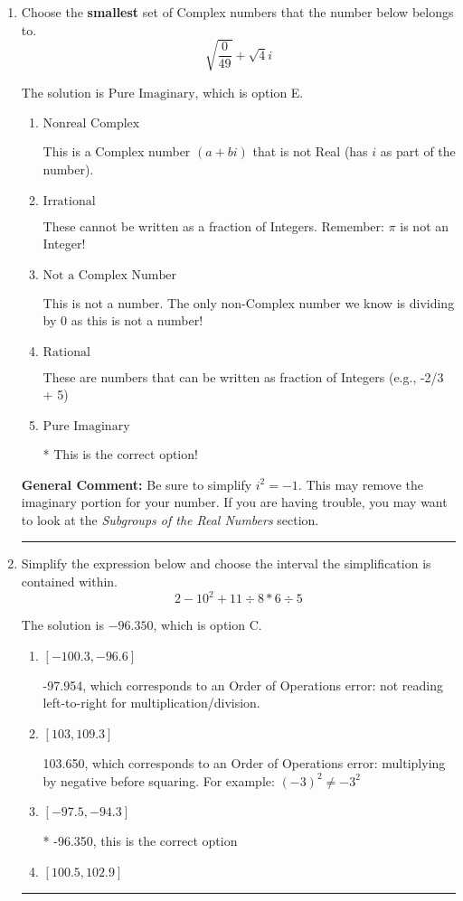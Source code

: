 \documentclass{extbook}[14pt]
\newcommand{\litem}[1]{\item #1

\rule{\textwidth}{0.4pt}}
\begin{document}
\begin{enumerate}\litem{
Choose the \textbf{smallest} set of Complex numbers that the number below belongs to.
\[ \sqrt{\frac{0}{49}}+\sqrt{4}i \]

The solution is \( \text{Pure Imaginary} \), which is option E.\begin{enumerate}[label=\Alph*.]
\item \( \text{Nonreal Complex} \)

This is a Complex number $(a+bi)$ that is not Real (has $i$ as part of the number).
\item \( \text{Irrational} \)

These cannot be written as a fraction of Integers. Remember: $\pi$ is not an Integer!
\item \( \text{Not a Complex Number} \)

This is not a number. The only non-Complex number we know is dividing by 0 as this is not a number!
\item \( \text{Rational} \)

These are numbers that can be written as fraction of Integers (e.g., -2/3 + 5)
\item \( \text{Pure Imaginary} \)

* This is the correct option!
\end{enumerate}

\textbf{General Comment:} Be sure to simplify $i^2 = -1$. This may remove the imaginary portion for your number. If you are having trouble, you may want to look at the \textit{Subgroups of the Real Numbers} section.
}
\litem{
Simplify the expression below and choose the interval the simplification is contained within.
\[ 2 - 10^2 + 11 \div 8 * 6 \div 5 \]

The solution is \( -96.350 \), which is option C.\begin{enumerate}[label=\Alph*.]
\item \( [-100.3, -96.6] \)

 -97.954, which corresponds to an Order of Operations error: not reading left-to-right for multiplication/division.
\item \( [103, 109.3] \)

 103.650, which corresponds to an Order of Operations error: multiplying by negative before squaring. For example: $(-3)^2 \neq -3^2$
\item \( [-97.5, -94.3] \)

* -96.350, this is the correct option
\item \( [100.5, 102.9] \)


\end{enumerate}}
\end{enumerate}
\end{document}
